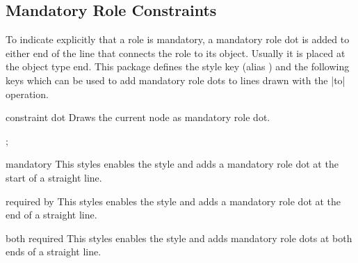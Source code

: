 \documentclass[a4paper,10pt]{article}
\begin{document}
\subsection{Mandatory Role Constraints}
\label{sec:mandatoryconstraints}
To indicate explicitly that a role is mandatory, a mandatory role dot is added to either end of the line that connects the role to its object. Usually it is placed at the object type end. This package defines the style key  (alias ) and the following keys which can be used to add mandatory role dots to lines drawn with the |to| operation.

\begin{stylekey}{constraint dot}
Draws the current node as mandatory role dot.
\begin{codeexample}[]
\tikz \node[cdot] {};
\end{codeexample}
\end{stylekey}

\begin{stylekey}{mandatory}
This styles enables the  style and adds a mandatory role dot at the start of a straight line.
\begin{codeexample}[]
\end{codeexample}
\end{stylekey}

\begin{stylekey}{required by}
This styles enables the  style and adds a mandatory role dot at the end of a straight line.
\begin{codeexample}[]
\end{codeexample}
\end{stylekey}

\begin{stylekey}{both required}
This styles enables the  style and adds mandatory role dots at both ends of a straight line.
\begin{codeexample}[]
\end{codeexample}
\end{stylekey}
\end{document}
